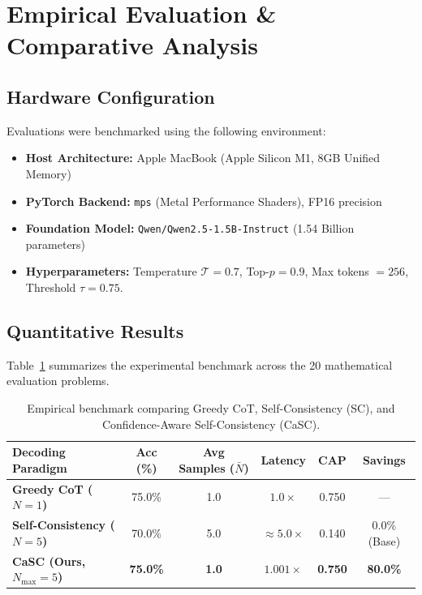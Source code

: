 \documentclass[11pt,a4paper]{article}
\begin{document}
\section{Empirical Evaluation \& Comparative Analysis}

\subsection{Hardware Configuration}
Evaluations were benchmarked using the following environment:
\begin{itemize}[leftmargin=*]
    \item \textbf{Host Architecture:} Apple MacBook (Apple Silicon M1, 8GB Unified Memory)
    \item \textbf{PyTorch Backend:} \texttt{mps} (Metal Performance Shaders), FP16 precision
    \item \textbf{Foundation Model:} \texttt{Qwen/Qwen2.5-1.5B-Instruct} (1.54 Billion parameters)
    \item \textbf{Hyperparameters:} Temperature $\mathcal{T} = 0.7$, Top-$p = 0.9$, Max tokens $= 256$, Threshold $\tau = 0.75$.
\end{itemize}

\subsection{Quantitative Results}
Table~\ref{tab:results} summarizes the experimental benchmark across the 20 mathematical evaluation problems.

\begin{table}[htbp]
\centering
\small
\begin{tabularx}{\textwidth}{lccccc}
\toprule
\textbf{Decoding Paradigm} & \textbf{Acc (\%)} & \textbf{Avg Samples ($\bar{N}$)} & \textbf{Latency} & \textbf{CAP} & \textbf{Savings} \\
\midrule
\textbf{Greedy CoT ($N=1$)} & 75.0\% & 1.0 & $1.0\times$ & 0.750 & --- \\
\textbf{Self-Consistency ($N=5$)} & 70.0\% & 5.0 & $\approx 5.0\times$ & 0.140 & 0.0\% (Base) \\
\textbf{CaSC (Ours, $N_{\text{max}}=5$)} & \textbf{75.0\%} & \textbf{1.0} & $\mathbf{1.001\times}$ & \textbf{0.750} & \textbf{80.0\%} \\
\bottomrule
\end{tabularx}
\caption{Empirical benchmark comparing Greedy CoT, Self-Consistency (SC), and Confidence-Aware Self-Consistency (CaSC).}
\label{tab:results}
\end{table}
\end{document}
